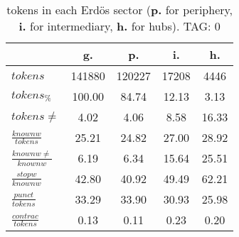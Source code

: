 \begin{table}[h!]
\begin{center}
\begin{tabular}{| l | c | c | c | c |}\hline
 & g. & p. & i. & h. \\\hline
$tokens$ & 141880  & 120227  & 17208  & 4446 \\\hline
$tokens_{\%}$ & 100.00  & 84.74  & 12.13  & 3.13 \\\hline
$tokens \neq$ & 4.02  & 4.06  & 8.58  & 16.33 \\\hline
$\frac{knownw}{tokens}$ & 25.21  & 24.82  & 27.00  & 28.92 \\\hline
$\frac{knownw \neq}{knownw}$ & 6.19  & 6.34  & 15.64  & 25.51 \\\hline
$\frac{stopw}{knownw}$ & 42.80  & 40.92  & 49.49  & 62.21 \\\hline
$\frac{punct}{tokens}$ & 33.29  & 33.90  & 30.93  & 25.98 \\\hline
$\frac{contrac}{tokens}$ & 0.13  & 0.11  & 0.23  & 0.20 \\\hline
\end{tabular}
\caption{tokens in each Erd\"os sector ({{\bf p.}} for periphery, {{\bf i.}} for intermediary, 
    {{\bf h.}} for hubs). TAG: 0}
\end{center}
\end{table}